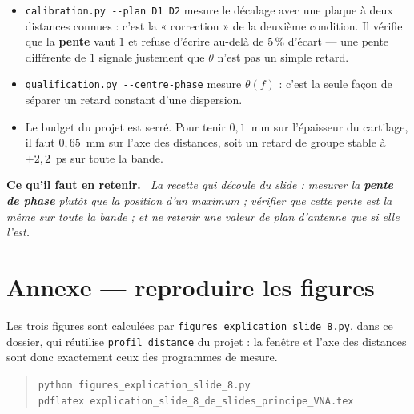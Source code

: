 \documentclass[11pt,a4paper]{article}
\newenvironment{implication}%
  {\par\medskip\begin{lrbox}{\implbox}\begin{minipage}{0.95\textwidth}%
   \textbf{Ce qu'il faut en retenir.}\itshape\ }%
  {\end{minipage}\end{lrbox}\noindent\fbox{\usebox{\implbox}}\par\medskip}
\begin{document}
\begin{itemize}
\item \texttt{calibration.py -{}-plan D1 D2} mesure le décalage avec une plaque
  à deux distances connues : c'est la « correction » de la deuxième condition.
  Il vérifie que la \textbf{pente} vaut $1$ et refuse d'écrire au-delà de
  $5\,\%$ d'écart --- une pente différente de $1$ signale justement que
  $\theta$ n'est pas un simple retard.
\item \texttt{qualification.py -{}-centre-phase} mesure $\theta(f)$ : c'est la
  seule façon de séparer un retard constant d'une dispersion.
\item Le budget du projet est serré. Pour tenir $0{,}1$~mm sur l'épaisseur du
  cartilage, il faut $0{,}65$~mm sur l'axe des distances, soit un retard de
  groupe stable à $\pm 2{,}2$~ps sur toute la bande.
\end{itemize}

\begin{implication}
La recette qui découle du slide : mesurer la \textbf{pente de phase} plutôt que
la position d'un maximum ; vérifier que cette pente est la même sur toute la
bande ; et ne retenir une valeur de plan d'antenne que si elle l'est.
\end{implication}

\section*{Annexe --- reproduire les figures}

Les trois figures sont calculées par \texttt{figures\_explication\_slide\_8.py},
dans ce dossier, qui réutilise \texttt{profil\_distance} du projet : la fenêtre
et l'axe des distances sont donc exactement ceux des programmes de mesure.
\begin{quote}
\texttt{python figures\_explication\_slide\_8.py}\\
\texttt{pdflatex explication\_slide\_8\_de\_slides\_principe\_VNA.tex}
\end{quote}
\end{document}
